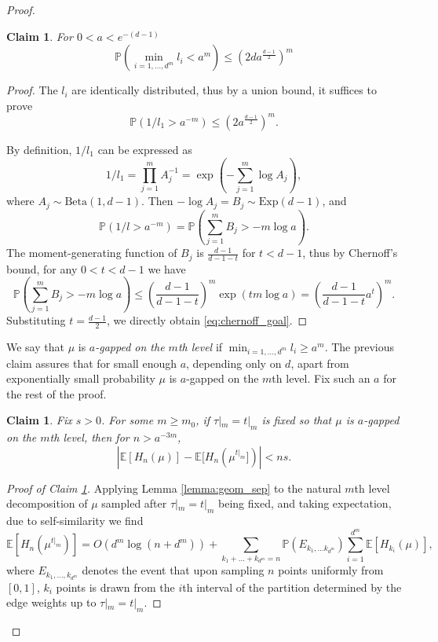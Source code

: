 \documentclass[11pt]{article}
\newcommand{\PP}{\mathbb{P}}
\newcommand{\EE}{\mathbb{E}}
\newtheorem{claim}[theorem]{Claim}
\theoremstyle{definition}
\begin{document}
\begin{proof}
\begin{claim}\label{claim:all_gaps_are_large}
For $0<a<e^{-(d-1)}$
$$\PP(\min_{i=1, \dots, d^{m}} l_i<a^m)\leq\left(2da^{\frac{d-1}{2}}\right)^m$$
\end{claim}

\begin{proof}
The $l_i$ are identically distributed, thus by a union bound, it suffices to prove
\begin{equation}\label{eq:chernoff_goal}
\PP(1/l_1>a^{-m})\leq \left(2a^{\frac{d-1}{2}}\right)^m.
\end{equation}

By definition, $1/l_1$ can be expressed as
$$1/l_1= \prod_{j=1}^{m}A_j^{-1}=\exp\left(-\sum_{j=1}^{m}\log A_j\right),$$
where $A_j\sim \mathrm{Beta}(1, d-1)$. Then $-\log A_j=B_j \sim \mathrm{Exp}(d-1)$, and
$$\PP(1/l>a^{-m})=\PP(\sum_{j=1}^{m} B_j>-m\log a).$$
The moment-generating function of $B_j$ is $\frac{d-1}{d-1-t}$ for $t<d-1$, thus by Chernoff's bound, for any $0<t<d-1$ we have
$$\PP(\sum_{j=1}^{m} B_j>-m\log a)\leq \left(\frac{d-1}{d-1-t}\right)^m \exp(tm\log a)=\left(\frac{d-1}{d-1-t}a^t\right)^m.$$
Substituting $t=\frac{d-1}{2}$, we directly obtain \eqref{eq:chernoff_goal}.    
\end{proof}

We say that $\mu$ is {\it $a$-gapped on the $m$th level} if $\min_{i=1, \dots, d^{m}} l_i\geq a^m$. The previous claim assures that for small enough $a$, depending only on $d$, apart from exponentially small probability $\mu$ is $a$-gapped on the $m$th level. Fix such an $a$ for the rest of the proof.

\begin{claim}\label{claim:expectation_offset_small}
    Fix $s>0$. For some $m\geq m_0$, if $\tau|_{m}=t|_{m}$ is fixed so that $\mu$ is $a$-gapped on the $m$th level, then for $n>a^{-3m}$, 
    $$|\EE [H_n(\mu)] - \EE [H_n(\mu^{t|_m}])|<ns.$$
\end{claim}

\begin{proof}[Proof of Claim \ref{claim:expectation_offset_small}]
    Applying Lemma \ref{lemma:geom_sep} to the natural $m$th level decomposition of $\mu$ sampled after $\tau|_{m}=t|_{m}$ being fixed, and taking expectation, due to self-similarity we find 
    \begin{equation}\label{eq:expectation_offset}
    \EE [H_n(\mu^{t|_m})] = O(d^m\log(n+d^m)) + \sum_{k_1 + \dots + k_{d^m}=n}\PP(E_{k_1, \dots k_{d^m}})\sum_{i=1}^{d^m}\EE [H_{k_i}(\mu)],
    \end{equation}
    where $E_{k_1, \dots, k_{d^m}}$ denotes the event that upon sampling $n$ points uniformly from $[0, 1]$, $k_i$ points is drawn from the $i$th interval of the partition determined by the edge weights up to $\tau|_{m}=t|_{m}$.
    

\end{proof}
\end{proof}
\end{document}
